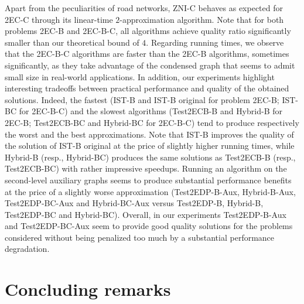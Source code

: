 \documentclass[11pt]{article}
\begin{document}
Apart from the peculiarities of road networks, \textsf{ZNI-C} behaves as expected for \textsf{2EC-C} through its linear-time $2$-approximation algorithm.
Note that for both problems \textsf{2EC-B} and \textsf{2EC-B-C}, all algorithms achieve quality ratio significantly smaller than our theoretical bound of $4$.
Regarding running times, we observe that the \textsf{2EC-B-C} algorithms are faster than the \textsf{2EC-B} algorithms, sometimes significantly, as
they take advantage of the condensed graph that seems to admit small size in real-world applications. In addition, our experiments highlight interesting tradeoffs between practical performance and quality of the obtained solutions.
Indeed, the fastest (\textsf{IST-B} and \textsf{IST-B original} for problem \textsf{2EC-B};
\textsf{IST-BC} for \textsf{2EC-B-C})
and the slowest algorithms (\textsf{Test2ECB-B} and \textsf{Hybrid-B} for \textsf{2EC-B};
\textsf{Test2ECB-BC} and \textsf{Hybrid-BC} for \textsf{2EC-B-C}) tend to produce respectively the worst and the best approximations.
Note that
\textsf{IST-B} improves the quality of the solution of \textsf{IST-B original} at the price of slightly higher running times, while \textsf{Hybrid-B} (resp., \textsf{Hybrid-BC}) produces the same solutions as \textsf{Test2ECB-B} (resp., \textsf{Test2ECB-BC}) with rather impressive speedups. Running an algorithm on the second-level auxiliary graphs seems to produce substantial performance benefits at the price of a slightly worse approximation (\textsf{Test2EDP-B-Aux}, \textsf{Hybrid-B-Aux}, \textsf{Test2EDP-BC-Aux} and \textsf{Hybrid-BC-Aux}  versus \textsf{Test2EDP-B}, \textsf{Hybrid-B}, \textsf{Test2EDP-BC} and \textsf{Hybrid-BC}).
Overall,
in our experiments \textsf{Test2EDP-B-Aux}
and \textsf{Test2EDP-BC-Aux} seem to provide
good quality solutions for the problems considered without being  penalized too much by a substantial performance degradation.


\section{Concluding remarks}
\label{sec:concluding}
\end{document}
